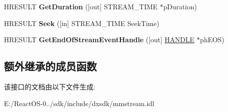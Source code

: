 \begin{DoxyCompactItemize}
H\+R\+E\+S\+U\+LT {\bfseries Get\+Duration} (\mbox{[}out\mbox{]} S\+T\+R\+E\+A\+M\+\_\+\+T\+I\+ME $\ast$p\+Duration)
\item 
\mbox{\label{interface_i_multi_media_stream_aa39eecd67cf1e6cf75f7df0a56cf6cec}} 
H\+R\+E\+S\+U\+LT {\bfseries Seek} (\mbox{[}in\mbox{]} S\+T\+R\+E\+A\+M\+\_\+\+T\+I\+ME Seek\+Time)
\item 
\mbox{\label{interface_i_multi_media_stream_a623d6f086fdbf3a3fd5060078cce8fb8}} 
H\+R\+E\+S\+U\+LT {\bfseries Get\+End\+Of\+Stream\+Event\+Handle} (\mbox{[}out\mbox{]} \hyperlink{interfacevoid}{H\+A\+N\+D\+LE} $\ast$ph\+E\+OS)
\end{DoxyCompactItemize}
\subsection*{额外继承的成员函数}


该接口的文档由以下文件生成\+:\begin{DoxyCompactItemize}
\item 
E\+:/\+React\+O\+S-\/0../sdk/include/dxsdk/mmstream.\+idl\end{DoxyCompactItemize}
